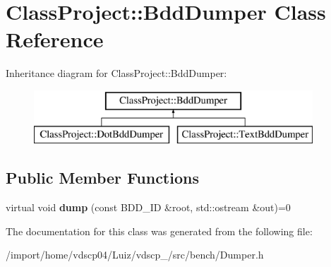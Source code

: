 \section{Class\+Project\+:\+:Bdd\+Dumper Class Reference}
\label{classClassProject_1_1BddDumper}
Inheritance diagram for Class\+Project\+:\+:Bdd\+Dumper\+:\begin{figure}[H]
\begin{center}
\leavevmode
\includegraphics[height=2.000000cm]{classClassProject_1_1BddDumper}
\end{center}
\end{figure}
\subsection*{Public Member Functions}
\begin{DoxyCompactItemize}
\item 
virtual void {\bfseries dump} (const B\+D\+D\+\_\+\+ID \&root, std\+::ostream \&out)=0\label{classClassProject_1_1BddDumper_ae0183004c7f247c8cbc6491de1de5507}

\end{DoxyCompactItemize}


The documentation for this class was generated from the following file\+:\begin{DoxyCompactItemize}
\item 
/import/home/vdscp04/\+Luiz/vdscp\+\_/src/bench/Dumper.\+h\end{DoxyCompactItemize}
